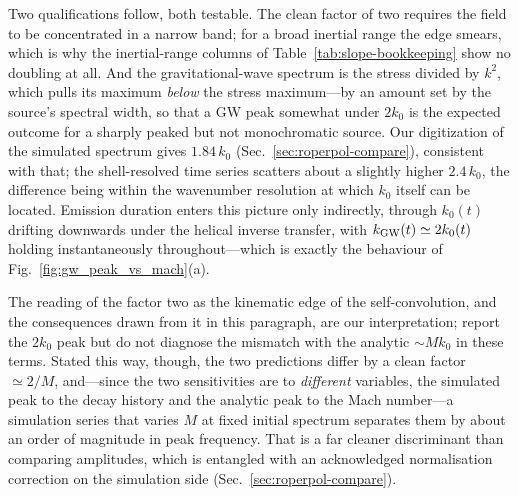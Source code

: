 \documentclass[10pt,prd,aps,nobibnotes,superscriptaddress,preprintnumbers,notitlepage]{revtex4-1}
\begin{document}
Two qualifications follow, both testable. The clean factor of two requires the field to be
concentrated in a narrow band; for a broad inertial range the edge smears, which is why the
inertial-range columns of Table~\ref{tab:slope-bookkeeping} show no doubling at all.
And the gravitational-wave spectrum is the stress divided by $k^2$, which pulls its maximum
\emph{below} the stress maximum---by an amount set by the source's spectral width, so that a
GW peak somewhat under $2k_0$ is the expected outcome for a sharply peaked but not
monochromatic source. Our digitization of the simulated spectrum gives $1.84\,k_0$
(Sec.~\ref{sec:roperpol-compare}), consistent with that; the shell-resolved time series
scatters about a slightly higher $2.4\,k_0$, the difference being within the wavenumber
resolution at which $k_0$ itself can be located. Emission duration enters this picture only
indirectly,
through $k_0(t)$ drifting downwards under the helical inverse transfer, with
$k_{\rm GW}(t)\simeq2k_0(t)$ holding instantaneously throughout---which is exactly the
behaviour of Fig.~\ref{fig:gw_peak_vs_mach}(a).

The reading of the factor two as the kinematic edge of the self-convolution, and the
consequences drawn from it in this paragraph, are our interpretation; \cite{RoperPol:2019wvy}
report the $2k_0$ peak but do not diagnose the mismatch with the analytic $\sim Mk_0$ in
these terms. Stated this way, though, the two predictions differ by a clean factor
$\simeq2/M$, and---since the two sensitivities are to \emph{different} variables, the
simulated peak to the decay history and the analytic peak to the Mach number---a simulation
series that varies $M$ at fixed initial spectrum separates them by about an order of
magnitude in peak frequency. That is a far cleaner discriminant than comparing amplitudes,
which is entangled with an acknowledged normalisation correction on the simulation side
(Sec.~\ref{sec:roperpol-compare}).
\end{document}
